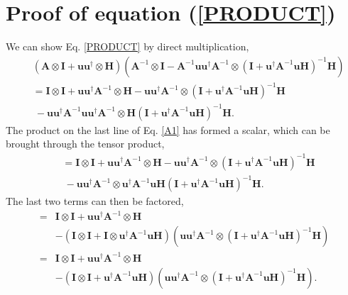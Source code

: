 \appendix
\section{Proof of equation (\ref{PRODUCT})} 
\label{ch:mm:sec:proof}

We can show Eq. \eqref{PRODUCT} by direct multiplication,
\begin{align}
&\left(\mathbf{A} \otimes \mathbf{I} + \mathbf{u}\mathbf{u}^\dagger \otimes \mathbf{H} \right) 
 \left( \mathbf{A}^{-1} \otimes \mathbf{I} - \mathbf{A}^{-1}\mathbf{u}\mathbf{u}^\dagger\mathbf{A}^{-1} \otimes \left(\mathbf{I} + \mathbf{u}^\dagger\mathbf{A}^{-1}\mathbf{u} \mathbf{H}\right)^{-1} \mathbf{H} \right)
 \nonumber \\
 &= \mathbf{I} \otimes \mathbf{I} + \mathbf{u}\mathbf{u}^\dagger\mathbf{A}^{-1} \otimes \mathbf{H} - \mathbf{u}\mathbf{u}^\dagger\mathbf{A}^{-1}\otimes \left(\mathbf{I} + \mathbf{u}^\dagger\mathbf{A}^{-1}\mathbf{u} \mathbf{H}\right)^{-1} \mathbf{H}
\nonumber \\
&~- \mathbf{u}\mathbf{u}^\dagger\mathbf{A}^{-1}\mathbf{u}\mathbf{u}^\dagger\mathbf{A}^{-1}\otimes \mathbf{H} \left(\mathbf{I} + \mathbf{u}^\dagger\mathbf{A}^{-1}\mathbf{u} \mathbf{H}\right)^{-1} \mathbf{H}. \label{A1}
\end{align}
The product on the last line of Eq. \eqref{A1} has formed a scalar, which can be brought through the tensor product,
\begin{align}
&= \mathbf{I} \otimes \mathbf{I} + \mathbf{u}\mathbf{u}^\dagger\mathbf{A}^{-1} \otimes \mathbf{H} - \mathbf{u}\mathbf{u}^\dagger\mathbf{A}^{-1}\otimes \left(\mathbf{I} + \mathbf{u}^\dagger\mathbf{A}^{-1}\mathbf{u} \mathbf{H}\right)^{-1} \mathbf{H}
\nonumber \\
&~- \mathbf{u}\mathbf{u}^\dagger\mathbf{A}^{-1}\otimes \mathbf{u}^\dagger\mathbf{A}^{-1}\mathbf{u}\mathbf{H} \left(\mathbf{I} + \mathbf{u}^\dagger\mathbf{A}^{-1}\mathbf{u}\mathbf{H}\right)^{-1} \mathbf{H}. 
\end{align}
The last two terms can then be factored,
\begin{align}
=& \mathbf{I} \otimes \mathbf{I} + \mathbf{u}\mathbf{u}^\dagger\mathbf{A}^{-1} \otimes \mathbf{H} 
\\ \nonumber &- \left( \mathbf{I} \otimes \mathbf{I} + \mathbf{I} \otimes \mathbf{u}^\dagger\mathbf{A}^{-1}\mathbf{u} \mathbf{H}\right)
 \left( \mathbf{u}\mathbf{u}^\dagger\mathbf{A}^{-1} \otimes \left(\mathbf{I} + \mathbf{u}^\dagger\mathbf{A}^{-1}\mathbf{u}\mathbf{H}\right)^{-1} \mathbf{H}\right)
\\ =& \mathbf{I} \otimes \mathbf{I} + \mathbf{u}\mathbf{u}^\dagger\mathbf{A}^{-1} \otimes \mathbf{H} 
\\ \nonumber &- \left( \mathbf{I} \otimes \mathbf{I} + \mathbf{u}^\dagger\mathbf{A}^{-1}\mathbf{u} \mathbf{H} \right)
 \left( \mathbf{u}\mathbf{u}^\dagger\mathbf{A}^{-1} \otimes \left(\mathbf{I} + \mathbf{u}^\dagger\mathbf{A}^{-1}\mathbf{u}\mathbf{H}\right)^{-1} \mathbf{H}\right).
 \end{align}
